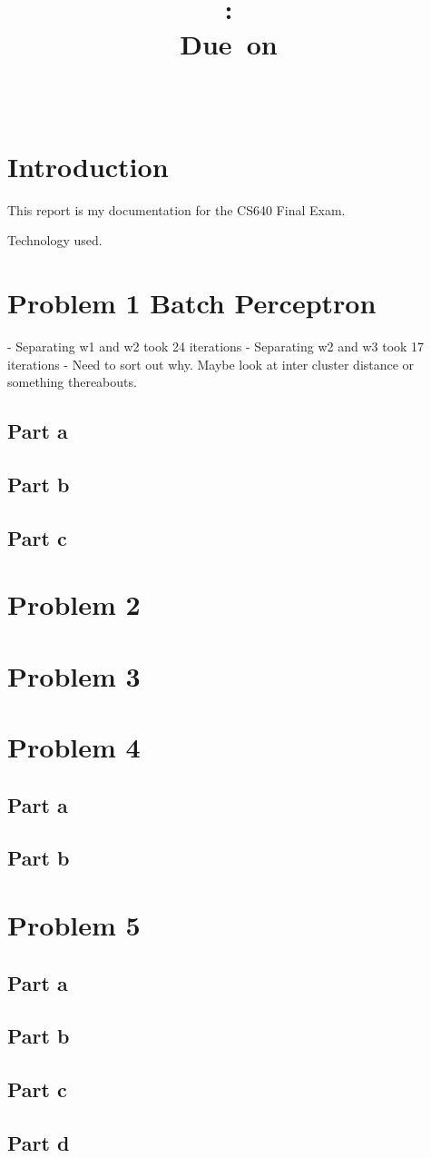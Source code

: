 \documentclass{article}
\title{\vspace{2in}\textmd{\textbf{\hmwkClass:\ \hmwkTitle\ifthenelse{\equal{\hmwkSubTitle}{}}{}{\\\hmwkSubTitle}}}\\\normalsize\vspace{0.1in}\small{Due\ on\ \hmwkDueDate}\\\vspace{0.1in}\large{\textit{\hmwkClassInstructor\ \hmwkClassTime}}\vspace{3in}}
\date{}
\author{\textbf{\hmwkAuthorName}}
\begin{document}
\maketitle

\section*{Introduction}
This report is my documentation for the CS640 Final Exam.

Technology used.

\section*{Problem 1 Batch Perceptron}
- Separating w1 and w2 took 24 iterations
- Separating w2 and w3 took 17 iterations
- Need to sort out why.  Maybe look at inter cluster distance or
  something thereabouts.

\subsection*{Part a}
\subsection*{Part b}
\subsection*{Part c}

\section*{Problem 2}

\section*{Problem 3}

\section*{Problem 4}
\subsection*{Part a}
\subsection*{Part b}

\section*{Problem 5}

\subsection*{Part a}
\subsection*{Part b}
\subsection*{Part c}
\subsection*{Part d}
\end{document}

